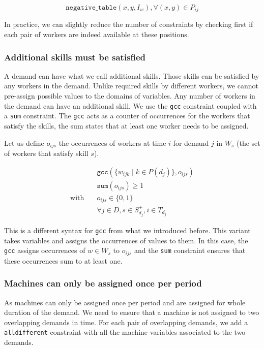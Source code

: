 \documentclass[../../thesis.tex]{subfiles}
\begin{document}
\begin{equation}
  \texttt{negative\_table}(x, y, I_{w}),  \forall (x, y) \in P_{ij}
\end{equation}

In practice, we can slightly reduce the number of constraints by checking first if each pair of workers are indeed available at these positions.

\subsubsection{Additional skills must be satisfied}

A demand can have what we call additional skills. Those skills can be 
satisfied by any workers in the demand. Unlike required skills by different workers,
we cannot pre-assign possible values to the domains of variables. Any number of workers in the demand can have an additional skill.
We use the \texttt{gcc} constraint coupled with a \texttt{sum} constraint.
The \texttt{gcc} acts as a counter of occurrences for the workers that satisfy the skills,
the sum states that at least one worker needs to be assigned.

Let us define $o_{ijs}$ the occurrences of workers at time $i$ for demand $j$ in $W_s$ (the set of workers that satisfy skill $s$).

\begin{align}
  &\texttt{gcc}(\{ w_{ijk} \mid k \in P(d_j) \}, o_{ijs}) \\ 
  &\texttt{sum}(o_{ijs}) \geq 1 \\
  \text{with} \quad & o_{ijs} \in \{ 0, 1 \} \\
  & \forall j \in D, s \in S^{+}_{d_j}, i \in T_{d_j}
\end{align}

This is a different syntax for \texttt{gcc} from what we introduced before. This variant takes 
variables and assigns the occurrences of values to them. In this case, the \texttt{gcc} assigns 
occurrences of $w \in W_s$ to $o_{ijs}$ and the \texttt{sum} constraint ensures that 
these occurrences sum to at least one.


\subsubsection{Machines can only be assigned once per period}

As machines can only be assigned once per period and are assigned for whole duration of the demand. We need 
to ensure that a machine is not assigned to two overlapping demands in time.
For each pair of overlapping demands,
we add a \texttt{alldifferent} constraint with all the machine variables associated to the two demands.
\end{document}
